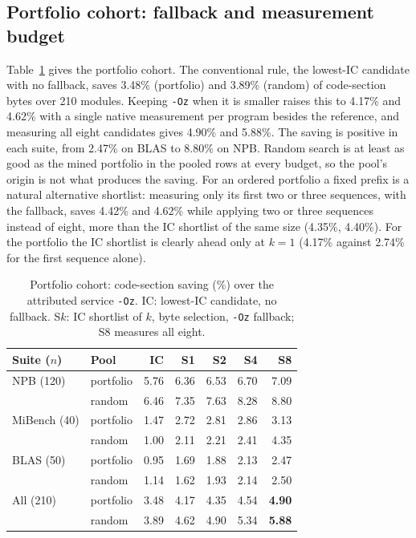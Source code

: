 \documentclass[conference,a4paper]{IEEEtran}
\begin{document}
\subsection{Portfolio cohort: fallback and measurement budget}
Table~\ref{tab:headline} gives the portfolio cohort. The conventional
rule, the lowest-IC candidate with no fallback, saves 3.48\%
(portfolio) and 3.89\% (random) of code-section bytes over 210 modules.
Keeping \texttt{-Oz} when it is smaller raises this to 4.17\% and
4.62\% with a single native measurement per program besides the
reference, and measuring all eight candidates gives 4.90\% and 5.88\%.
The saving is positive in each suite, from 2.47\% on BLAS to 8.80\% on
NPB. Random search is at least as good as the mined portfolio in the
pooled rows at every budget, so the pool's origin is not what produces
the saving. For an ordered portfolio a fixed prefix is a natural
alternative shortlist: measuring only its first two or three sequences,
with the fallback, saves 4.42\% and 4.62\% while applying two or three
sequences instead of eight, more than the IC shortlist of the same size
(4.35\%, 4.40\%). For the portfolio the IC shortlist is clearly ahead
only at $k{=}1$ (4.17\% against 2.74\% for the first sequence alone).

\begin{table}[t]
\caption{Portfolio cohort: code-section saving (\%) over the attributed
service \texttt{-Oz}. IC: lowest-IC candidate, no fallback. S$k$: IC
shortlist of $k$, byte selection, \texttt{-Oz} fallback; S8 measures
all eight.}
\label{tab:headline}
\centering
\footnotesize
\setlength{\tabcolsep}{3.6pt}
\begin{tabular}{llrrrrr}
\toprule
Suite ($n$) & Pool & IC & S1 & S2 & S4 & S8 \\
\midrule
NPB (120)    & portfolio & 5.76 & 6.36 & 6.53 & 6.70 & 7.09 \\
             & random    & 6.46 & 7.35 & 7.63 & 8.28 & 8.80 \\
MiBench (40) & portfolio & 1.47 & 2.72 & 2.81 & 2.86 & 3.13 \\
             & random    & 1.00 & 2.11 & 2.21 & 2.41 & 4.35 \\
BLAS (50)    & portfolio & 0.95 & 1.69 & 1.88 & 2.13 & 2.47 \\
             & random    & 1.14 & 1.62 & 1.93 & 2.14 & 2.50 \\
\midrule
All (210)    & portfolio & 3.48 & 4.17 & 4.35 & 4.54 & \textbf{4.90} \\
             & random    & 3.89 & 4.62 & 4.90 & 5.34 & \textbf{5.88} \\
\bottomrule
\end{tabular}
\end{table}
\end{document}
